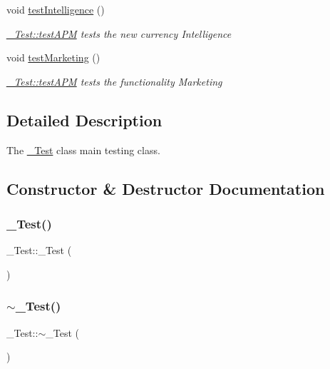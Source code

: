 \begin{DoxyCompactItemize}
void \mbox{\hyperlink{class__Test_aa337b0ffaa271362d37b5ea92630b58d}{test\+Intelligence}} ()
\begin{DoxyCompactList}\small\item\em \mbox{\hyperlink{class__Test_adb7f71ea12e1b02afd6b4d1f7d65c1eb}{\+\_\+\+Test\+::test\+A\+PM}} tests the new currency Intelligence \end{DoxyCompactList}\item 
void \mbox{\hyperlink{class__Test_a635f82c86b1c9c07ffd70a704a790311}{test\+Marketing}} ()
\begin{DoxyCompactList}\small\item\em \mbox{\hyperlink{class__Test_adb7f71ea12e1b02afd6b4d1f7d65c1eb}{\+\_\+\+Test\+::test\+A\+PM}} tests the functionality Marketing \end{DoxyCompactList}\end{DoxyCompactItemize}


\subsection{Detailed Description}
The \mbox{\hyperlink{class__Test}{\+\_\+\+Test}} class main testing class. 

\subsection{Constructor \& Destructor Documentation}
\mbox{\label{class__Test_a03ecfe4fd048c42338c5c54f73d830e2}} 
\subsubsection{\texorpdfstring{\_Test()}{\_Test()}}
{\footnotesize\ttfamily \+\_\+\+Test\+::\+\_\+\+Test (\begin{DoxyParamCaption}{ }\end{DoxyParamCaption})}

\mbox{\label{class__Test_ac861d8bc0d139b86c2f30528d8c1bbbc}} 
\subsubsection{\texorpdfstring{$\sim$\_Test()}{~\_Test()}}
{\footnotesize\ttfamily \+\_\+\+Test\+::$\sim$\+\_\+\+Test (\begin{DoxyParamCaption}{ }\end{DoxyParamCaption})}



